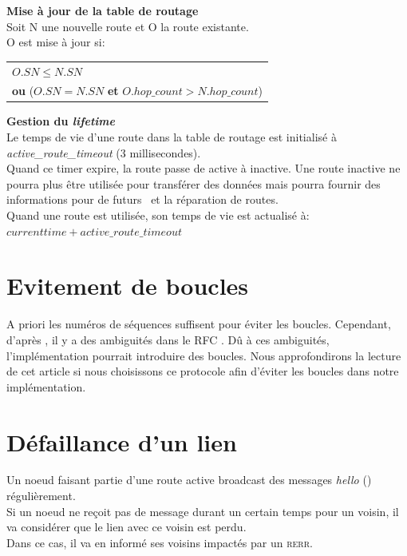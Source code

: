         \textbf{Mise à jour de la table de routage}\\
            Soit N une nouvelle route et O la route existante.\\
            O est mise à jour si:\\
            \begin{center}
                \begin{tabular}{|l|}
                    \hline
                    $O.SN \leq N.SN$ \\
                    \textbf{ou} ($O.SN = N.SN$ \textbf{et} $O.hop\_count > N.hop\_count$)\\
                    \hline
                \end{tabular}
            \end{center}
        
        \textbf{Gestion du \textit{lifetime}}\\
            Le temps de vie d'une route dans la table de routage est initialisé à \textit{active\_route\_timeout} (3 millisecondes).\\
            Quand ce timer expire, la route passe de active à inactive. Une route inactive ne pourra plus être utilisée pour transférer des données
            mais pourra fournir des informations pour de futurs \rreq\  et la réparation de routes.\\
            Quand une route est utilisée, son temps de vie  est actualisé à: $current time + active\_route\_timeout$

    \section{Evitement de boucles}
        A priori les numéros de séquences suffisent pour éviter les boucles. Cependant, d'après \cite{loop_aodv}, il y a des
        ambiguités dans le RFC \cite{rfc_aodv}. Dû à ces ambiguités, l'implémentation pourrait introduire des boucles.
        Nous approfondirons la lecture de cet article si nous choisissons ce protocole afin d'éviter les boucles dans notre implémentation.

    \section{Défaillance d'un lien}
        Un noeud faisant partie d'une route active broadcast des messages \textit{hello} (\rrep)
        régulièrement.\\
        Si un noeud ne reçoit pas de message durant un certain temps pour un voisin, il va considérer
        que le lien avec ce voisin est perdu.\\
        Dans ce cas, il va en informé ses voisins impactés par un \textsc{rerr}.
    
